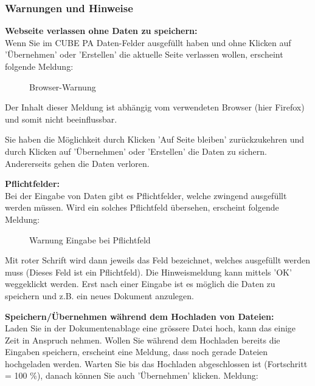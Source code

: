 \subsubsection{Warnungen und Hinweise}

\textbf{Webseite verlassen ohne Daten zu speichern:} \\
Wenn Sie im CUBE PA Daten-Felder ausgefüllt haben und ohne Klicken auf 'Übernehmen' oder 'Erstellen' die aktuelle Seite verlassen wollen, erscheint folgende Meldung: 

\begin{figure}[H]
\caption{Browser-Warnung}
\end{figure}
\begin{small}
Der Inhalt dieser Meldung ist abhängig vom verwendeten Browser (hier Firefox) und somit nicht beeinflussbar.
\end{small}

\vspace{\baselineskip}

Sie haben die Möglichkeit durch Klicken 'Auf Seite bleiben' zurückzukehren und durch Klicken auf 'Übernehmen' oder 'Erstellen' die Daten zu sichern. Andererseits gehen die Daten verloren.

\vspace{\baselineskip}

\textbf{Pflichtfelder:}\\
Bei der Eingabe von Daten gibt es Pflichtfelder, welche zwingend ausgefüllt werden müssen. Wird ein solches Pflichtfeld übersehen, erscheint folgende Meldung:

\begin{figure}[H]
\caption{Warnung Eingabe bei Pflichtfeld}
\end{figure}

Mit roter Schrift wird dann jeweils das Feld bezeichnet, welches ausgefüllt werden muss (Dieses Feld ist ein Pflichtfeld). Die Hinweismeldung kann mittels 'OK' weggeklickt werden. Erst nach einer Eingabe ist es möglich die Daten zu speichern und z.B. ein neues Dokument anzulegen. 

\vspace{\baselineskip}

\textbf{Speichern/Übernehmen während dem Hochladen von Dateien:}\\
Laden Sie in der Dokumentenablage eine grössere Datei hoch, kann das einige Zeit in Anspruch nehmen. Wollen Sie während dem Hochladen bereits die Eingaben speichern, erscheint eine Meldung, dass noch gerade Dateien hochgeladen werden. Warten Sie bis das Hochladen abgeschlossen ist (Fortschritt = 100 \%), danach können Sie auch 'Übernehmen' klicken. Meldung:

